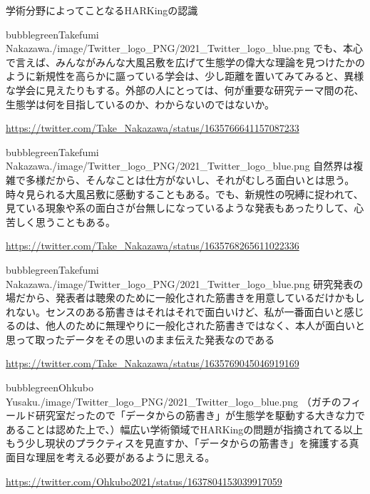 \begin{SMbox}{学術分野によってことなるHARKingの認識}
        \begin{rightbubbles}{bubblegreen}{Takefumi Nakazawa}{./image/Twitter_logo_PNG/2021_Twitter_logo_blue.png}
            でも、本心で言えば、みんながみんな大風呂敷を広げて生態学の偉大な理論を見つけたかのように新規性を高らかに謳っている学会は、少し距離を置いてみてみると、異様な学会に見えたりもする。外部の人にとっては、何が重要な研究テーマ間の花、生態学は何を目指しているのか、わからないのではないか。
            \begin{flushright} 
            \small	\url{https://twitter.com/Take_Nakazawa/status/1635766641157087233}
            \end{flushright}    
        \end{rightbubbles}

        \begin{rightbubbles}{bubblegreen}{Takefumi Nakazawa}{./image/Twitter_logo_PNG/2021_Twitter_logo_blue.png}
            自然界は複雑で多様だから、そんなことは仕方がないし、それがむしろ面白いとは思う。時々見られる大風呂敷に感動することもある。でも、新規性の呪縛に捉われて、見ている現象や系の面白さが台無しになっているような発表もあったりして、心苦しく思うこともある。
            \begin{flushright} 
            \small	\url{https://twitter.com/Take_Nakazawa/status/1635768265611022336}
            \end{flushright}    
        \end{rightbubbles}
        \begin{rightbubbles}{bubblegreen}{Takefumi Nakazawa}{./image/Twitter_logo_PNG/2021_Twitter_logo_blue.png}
            研究発表の場だから、発表者は聴衆のために一般化された筋書きを用意しているだけかもしれない。センスのある筋書きはそれはそれで面白いけど、私が一番面白いと感じるのは、他人のために無理やりに一般化された筋書きではなく、本人が面白いと思って取ったデータをその思いのまま伝えた発表なのである
            \begin{flushright} 
            \small	\url{https://twitter.com/Take_Nakazawa/status/1635769045046919169}
            \end{flushright}    
        \end{rightbubbles}

        \begin{rightbubbles}{bubblegreen}{Ohkubo Yusaku}{./image/Twitter_logo_PNG/2021_Twitter_logo_blue.png}
            （ガチのフィールド研究室だったので「データからの筋書き」が生態学を駆動する大きな力であることは認めた上で、）幅広い学術領域でHARKingの問題が指摘されてる以上もう少し現状のプラクティスを見直すか、「データからの筋書き」を擁護する真面目な理屈を考える必要があるように思える。
            \begin{flushright} 
            \small	\url{https://twitter.com/Ohkubo2021/status/1637804153039917059}
            \end{flushright}    
        \end{rightbubbles}


\end{SMbox}
